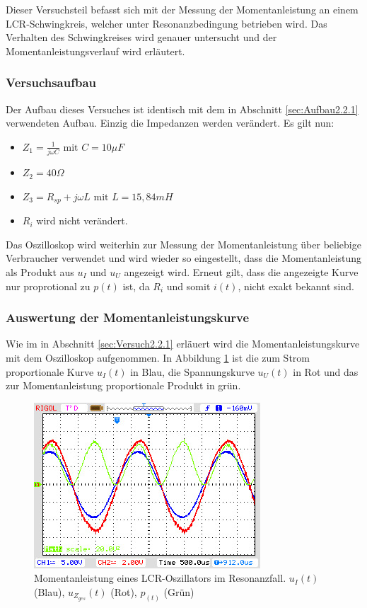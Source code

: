 
Dieser Versuchsteil befasst sich mit der Messung der Momentanleistung an einem LCR-Schwingkreis, welcher unter Resonanzbedingung betrieben wird. Das Verhalten des Schwingkreises wird genauer untersucht und der Momentanleistungsverlauf wird erläutert.

\subsubsection{Versuchsaufbau}
Der Aufbau dieses Versuches ist identisch mit dem in Abschnitt \ref{sec:Aufbau2.2.1} verwendeten Aufbau. Einzig die Impedanzen werden verändert. Es gilt nun:
\begin{itemize}
\item $Z_1 = \frac{1}{j\omega C} \mbox{ mit } C=10\mu F $
\item $Z_2 = 40\Omega$
\item $Z_3 = R_{sp} + j\omega L \mbox{ mit } L=15,84mH$
\item $R_i$ wird nicht verändert. 
\end{itemize}

Das Oszilloskop wird weiterhin zur Messung der Momentanleistung über beliebige Verbraucher verwendet und wird wieder so eingestellt, dass die Momentanleistung als Produkt aus $u_I$ und $u_U$ angezeigt wird. Erneut gilt, dass die angezeigte Kurve nur proprotional zu $p(t)$ ist, da $R_i$ und somit $i(t)$, nicht exakt bekannt sind.

\subsubsection{Auswertung der Momentanleistungskurve}

Wie im in Abschnitt \ref{sec:Versuch2.2.1} erläuert wird die Momentanleistungskurve mit dem Oszilloskop aufgenommen. In Abbildung \ref{fig:MomLKurveResonanz} ist die zum Strom proportionale Kurve $u_I(t)$ in Blau, die Spannungskurve $u_U(t)$ in Rot und das zur Momentanleistung proportionale Produkt in grün.

\begin{figure}[H]
\centering
\includegraphics[width=0.7\linewidth]{Oszi-Bitmaps/NewFile4.jpg}
\caption{Momentanleistung eines LCR-Oszillators im Resonanzfall. $u_I(t)$ (Blau), $u_{Z_{ges}}(t)$ (Rot), $p_(t)$ (Grün)}
\label{fig:MomLKurveResonanz}
\end{figure}


